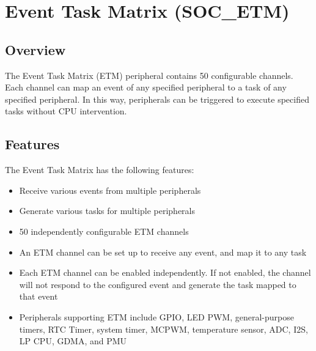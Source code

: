 \documentclass[main\_\_EN.tex]{subfiles}
\begin{document}

\ifglobal
\else
    {\let\clearpage\relax \listoftodos}
    {\let\clearpage\relax \listofdonetodos}
    \tableofcontents
\fi



\hypertarget{evntaskmatrix}{}
\chapter{Event Task Matrix (SOC\_ETM)}
\label{mod:evntaskmatrix}



\section{Overview}
The Event Task Matrix (ETM) peripheral contains 50 configurable channels. Each channel can map an event of any specified peripheral to a task of any specified peripheral. In this way, peripherals can be triggered to execute specified tasks without CPU intervention.



\section{Features}
\label{sec:evntaskmatrix-features}

The Event Task Matrix has the following features:
\begin{itemize}
    \item Receive various events from multiple peripherals
    \item Generate various tasks for multiple peripherals
    \item 50 independently configurable ETM channels
    \item An ETM channel can be set up to receive any event, and map it to any task
    \item Each ETM channel can be enabled independently. If not enabled, the channel will not respond to the configured event and generate the task mapped to that event
    \item Peripherals supporting ETM include GPIO, LED PWM, general-purpose timers, RTC Timer, system timer, MCPWM, temperature sensor, ADC, I2S, LP CPU, GDMA, and PMU
\end{itemize}
\end{document}
